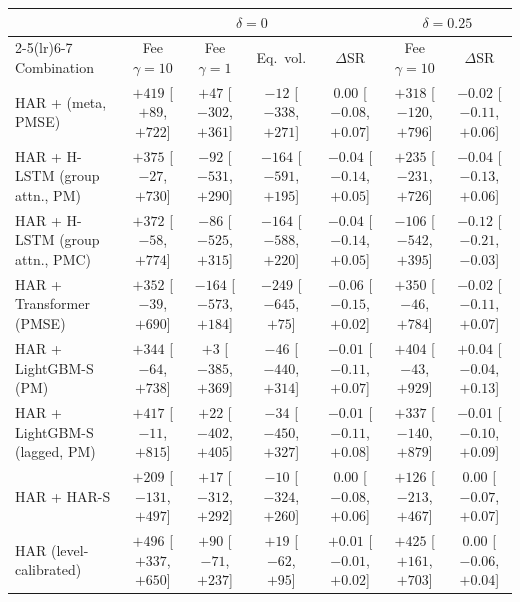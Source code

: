 \begin{tabular}{lcccccc}
\toprule
 & \multicolumn{4}{c}{$\delta = 0$} & \multicolumn{2}{c}{$\delta = 0.25$} \\
\cmidrule(lr){2-5}\cmidrule(lr){6-7}
Combination & Fee $\gamma{=}10$ & Fee $\gamma{=}1$ & Eq.\ vol. & $\Delta$SR & Fee $\gamma{=}10$ & $\Delta$SR \\
\midrule
HAR + \HQ{} (meta, PMSE) & $+419$ \scriptsize[$+89$, $+722$] & $+47$ \scriptsize[$-302$, $+361$] & $-12$ \scriptsize[$-338$, $+271$] & $0.00$ \scriptsize[$-0.08$, $+0.07$] & $+318$ \scriptsize[$-120$, $+796$] & $-0.02$ \scriptsize[$-0.11$, $+0.06$] \\
HAR + H-LSTM (group attn., PM) & $+375$ \scriptsize[$-27$, $+730$] & $-92$ \scriptsize[$-531$, $+290$] & $-164$ \scriptsize[$-591$, $+195$] & $-0.04$ \scriptsize[$-0.14$, $+0.05$] & $+235$ \scriptsize[$-231$, $+726$] & $-0.04$ \scriptsize[$-0.13$, $+0.06$] \\
HAR + H-LSTM (group attn., PMC) & $+372$ \scriptsize[$-58$, $+774$] & $-86$ \scriptsize[$-525$, $+315$] & $-164$ \scriptsize[$-588$, $+220$] & $-0.04$ \scriptsize[$-0.14$, $+0.05$] & $-106$ \scriptsize[$-542$, $+395$] & $-0.12$ \scriptsize[$-0.21$, $-0.03$] \\
HAR + Transformer (PMSE) & $+352$ \scriptsize[$-39$, $+690$] & $-164$ \scriptsize[$-573$, $+184$] & $-249$ \scriptsize[$-645$, $+75$] & $-0.06$ \scriptsize[$-0.15$, $+0.02$] & $+350$ \scriptsize[$-46$, $+784$] & $-0.02$ \scriptsize[$-0.11$, $+0.07$] \\
HAR + LightGBM-S (PM) & $+344$ \scriptsize[$-64$, $+738$] & $+3$ \scriptsize[$-385$, $+369$] & $-46$ \scriptsize[$-440$, $+314$] & $-0.01$ \scriptsize[$-0.11$, $+0.07$] & $+404$ \scriptsize[$-43$, $+929$] & $+0.04$ \scriptsize[$-0.04$, $+0.13$] \\
HAR + LightGBM-S (lagged, PM) & $+417$ \scriptsize[$-11$, $+815$] & $+22$ \scriptsize[$-402$, $+405$] & $-34$ \scriptsize[$-450$, $+327$] & $-0.01$ \scriptsize[$-0.11$, $+0.08$] & $+337$ \scriptsize[$-140$, $+879$] & $-0.01$ \scriptsize[$-0.10$, $+0.09$] \\
HAR + HAR-S & $+209$ \scriptsize[$-131$, $+497$] & $+17$ \scriptsize[$-312$, $+292$] & $-10$ \scriptsize[$-324$, $+260$] & $0.00$ \scriptsize[$-0.08$, $+0.06$] & $+126$ \scriptsize[$-213$, $+467$] & $0.00$ \scriptsize[$-0.07$, $+0.07$] \\
HAR (level-calibrated) & $+496$ \scriptsize[$+337$, $+650$] & $+90$ \scriptsize[$-71$, $+237$] & $+19$ \scriptsize[$-62$, $+95$] & $+0.01$ \scriptsize[$-0.01$, $+0.02$] & $+425$ \scriptsize[$+161$, $+703$] & $0.00$ \scriptsize[$-0.06$, $+0.04$] \\
\bottomrule
\end{tabular}
